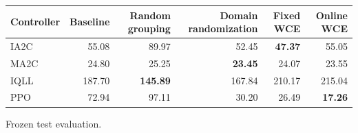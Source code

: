 \begin{tabular}{lrrrrr}
\hline
Controller & Baseline & Random grouping & Domain randomization & Fixed WCE & Online WCE \\
\hline
IA2C & 55.08 & 89.97 & 52.45 & \textbf{47.37} & 55.05 \\
MA2C & 24.80 & 25.25 & \textbf{23.45} & 24.07 & 23.55 \\
IQLL & 187.70 & \textbf{145.89} & 167.84 & 210.17 & 215.04 \\
PPO & 72.94 & 97.11 & 30.20 & 26.49 & \textbf{17.26} \\
\hline
\end{tabular}
Frozen test evaluation.
